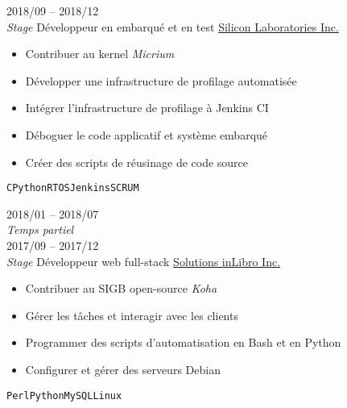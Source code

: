 \documentclass[9pt]{developercv} %
\begin{document}
\begin{minipage}[t]{0.8\textwidth}

\begin{entrylist}
	\entry
		{2018/09 -- 2018/12\\{\small\emph{Stage}}}
		{Développeur en embarqué et en test}
		{\href{https://www.silabs.com/}{Silicon Laboratories Inc.}}
		{
			\vspace{-14pt}
			\begin{itemize}
				\renewcommand{\labelitemi}{\raisebox{.45ex}{\rule{.6ex}{.6ex}}}
				\setlength\itemsep{-1pt}
				\item Contribuer au kernel \emph{Micrium}
				\item Développer une infrastructure de profilage automatisée
				\item Intégrer l'infrastructure de profilage à Jenkins CI
				\item Déboguer le code applicatif et système embarqué
				\item Créer des scripts de réusinage de code source
			\end{itemize}
			\vspace{-4pt}
			\texttt{C}\slashsep\texttt{Python}\slashsep\texttt{RTOS}\slashsep\texttt{Jenkins}\slashsep\texttt{SCRUM}
		}
	\entry
		{2018/01 -- 2018/07\\{\small\emph{Temps partiel}}\\2017/09 -- 2017/12\\{\small\emph{Stage}}}
		{Développeur web full-stack}
		{\href{https://inlibro.com/}{Solutions inLibro Inc.}}
		{
			\vspace{-14pt}
			\begin{itemize}
				\renewcommand{\labelitemi}{\raisebox{.45ex}{\rule{.6ex}{.6ex}}}
				\setlength\itemsep{-1pt}
				\item Contribuer au SIGB open-source \emph{Koha}
				\item Gérer les tâches et interagir avec les clients
				\item Programmer des scripts d'automatisation en Bash et en Python
				\item Configurer et gérer des serveurs Debian
			\end{itemize}
			\vspace{-4pt}
			\texttt{Perl}\slashsep\texttt{Python}\slashsep\texttt{MySQL}\slashsep\texttt{Linux}
		}
\end{entrylist}



\end{minipage}
\end{document}
